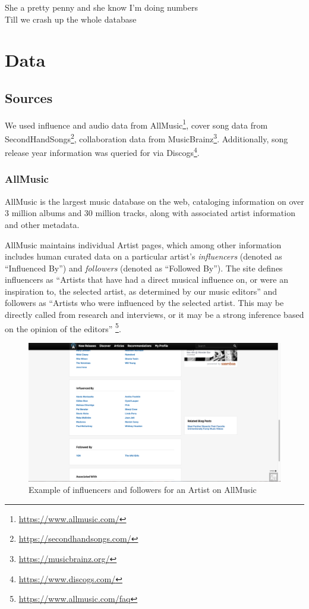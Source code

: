 \begin{savequote}[75mm] 
She a pretty penny and she know I'm doing numbers\\
Till we crash up the whole database
\end{savequote}

\chapter{Data}

\section{Sources}
We used influence and audio data from AllMusic\footnote{\url{https://www.allmusic.com/}}, cover song data from SecondHandSongs\footnote{\url{https://secondhandsongs.com/}}, collaboration data from MusicBrainz\footnote{\url{https://musicbrainz.org/}}. Additionally, song release year information was queried for via Discogs\footnote{\url{https://www.discogs.com/}}.

\subsection{AllMusic}
AllMusic is the largest music database on the web, cataloging information on over 3 million albums and 30 million tracks, along with associated artist information and other metadata.

AllMusic maintains individual Artist pages, which among other information includes human curated data on a particular artist's \textit{influencers} (denoted as ``Influenced By'') and \textit{followers} (denoted as ``Followed By''). The site defines influencers as ``Artists that have had a direct musical influence on, or were an inspiration to, the selected artist, as determined by our music editors'' and followers as ``Artists who were influenced by the selected artist. This may be directly called  from research and interviews, or it may be a strong inference based on the opinion of the editors'' \footnote{\url{https://www.allmusic.com/faq}}.

\begin{figure}[H]
\includegraphics[width=\textwidth]{figures/allmusic_influences.png}
\caption{Example of influencers and followers for an Artist on AllMusic}
\end{figure}

